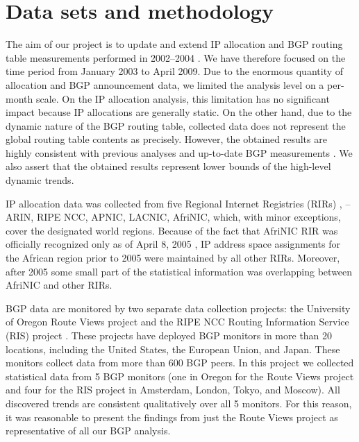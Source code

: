 \section{Data sets and methodology}
\label{sec:data sets}

The aim of our project is to update and extend IP allocation and BGP routing
table measurements performed in 2002--2004
\cite{Meng:2003:An-analysis-of-BGP-routing} \cite{Xu:2003:IPv4-Address}
\cite{Meng:2005:IPv4-address}. We have therefore focused on the time period
from January 2003 to April 2009. Due to the enormous quantity of allocation and
BGP announcement data, we limited the analysis level on a per-month scale. On the IP allocation analysis, this limitation has no significant impact because IP allocations are generally static. On the other hand,
due to the dynamic nature of the BGP routing table, collected data does not
represent the global routing table contents as precisely. However, the obtained
results are highly consistent with previous analyses
\cite{Meng:2005:IPv4-address} and up-to-date BGP measurements
\cite{::IPv4-Address-Report}. We also assert that the obtained results
represent lower bounds of the high-level dynamic trends.


IP allocation data was collected from five Regional Internet Registries (RIRs)
\cite{::IANA----Number}, -- ARIN, RIPE NCC, APNIC, LACNIC, AfriNIC, which,
with minor exceptions, cover the designated world regions. Because of the fact that
AfriNIC RIR was officially recognized only as of April 8, 2005
\cite{AKPLOGAN:2005:AfriNIC-now-officially}, IP address space assignments for
the African region prior to 2005 were maintained by all other RIRs. Moreover,
after 2005 some small part of the statistical information was overlapping
between AfriNIC and other RIRs.

BGP data are monitored by two separate data collection projects: the
University of Oregon Route Views project \cite{::Route-Views} and the RIPE NCC
Routing Information Service (RIS) project \cite{::RIS}. These projects have
deployed BGP monitors in more than 20 locations, including the
United States, the European Union, and Japan. These monitors collect data from more
than 600 BGP peers. In this project we collected statistical data from 5
BGP monitors (one in Oregon for the Route Views project and four for the RIS project in Amsterdam,
London, Tokyo, and Moscow). All discovered trends are
consistent qualitatively over all 5 monitors. For this reason, it was reasonable to present the findings from just the Route Views project as representative of all our BGP analysis.

